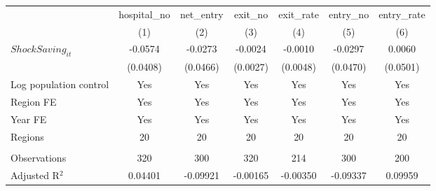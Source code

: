 \begingroup
\centering
\begin{tabular}{lcccccc}
   \toprule
                          & hospital\_no  & net\_entry  & exit\_no  & exit\_rate  & entry\_no  & entry\_rate \\    
                          & (1)           & (2)         & (3)       & (4)         & (5)        & (6)\\  
   \midrule 
   $ShockSaving_{it}$     & -0.0574       & -0.0273     & -0.0024   & -0.0010     & -0.0297    & 0.0060\\   
                          & (0.0408)      & (0.0466)    & (0.0027)  & (0.0048)    & (0.0470)   & (0.0501)\\   
   Log population control & Yes           & Yes         & Yes       & Yes         & Yes        & Yes\\  
   Region FE              & Yes           & Yes         & Yes       & Yes         & Yes        & Yes\\  
   Year FE                & Yes           & Yes         & Yes       & Yes         & Yes        & Yes\\  
   Regions                & 20            & 20          & 20        & 20          & 20         & 20\\  
    \\
   Observations           & 320           & 300         & 320       & 214         & 300        & 200\\  
   Adjusted R$^2$         & 0.04401       & -0.09921    & -0.00165  & -0.00350    & -0.09337   & 0.09959\\  
   \bottomrule
\end{tabular}
\par\endgroup
